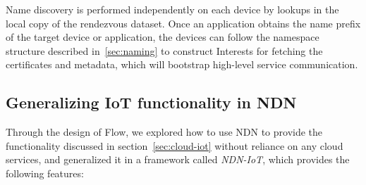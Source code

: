 Name discovery is performed independently on each device by lookups in the local copy of the rendezvous dataset.
Once an application obtains the name prefix of the target device or application, the devices can follow the namespace structure described in~\ref{sec:naming} to construct Interests for fetching the certificates and metadata, which will bootstrap high-level service communication.


\subsection{Generalizing IoT functionality in NDN}

Through the design of Flow, we explored how to use NDN to provide the functionality discussed in section~\ref{sec:cloud-iot} without reliance on any cloud services, and generalized it in a framework called \textit{NDN-IoT}, which provides the following features: 

